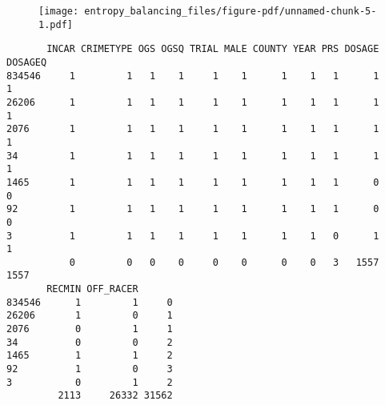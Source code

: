 \documentclass[
  letterpaper,
  DIV=11,
  numbers=noendperiod]{scrartcl}
\newenvironment{Shaded}{\begin{snugshade}}{\end{snugshade}}
\newcommand{\AttributeTok}[1]{\textcolor[rgb]{0.40,0.45,0.13}{#1}}
\newcommand{\ConstantTok}[1]{\textcolor[rgb]{0.56,0.35,0.01}{#1}}
\newcommand{\DecValTok}[1]{\textcolor[rgb]{0.68,0.00,0.00}{#1}}
\newcommand{\FunctionTok}[1]{\textcolor[rgb]{0.28,0.35,0.67}{#1}}
\newcommand{\NormalTok}[1]{\textcolor[rgb]{0.00,0.23,0.31}{#1}}
\newcommand{\OtherTok}[1]{\textcolor[rgb]{0.00,0.23,0.31}{#1}}
\newcommand{\SpecialCharTok}[1]{\textcolor[rgb]{0.37,0.37,0.37}{#1}}
\newcommand{\StringTok}[1]{\textcolor[rgb]{0.13,0.47,0.30}{#1}}
\begin{document}
\begin{figure}[H]

{\centering \texttt{[image: entropy\_balancing\_files/figure-pdf/unnamed-chunk-5-1.pdf]}

}

\end{figure}

\begin{verbatim}
       INCAR CRIMETYPE OGS OGSQ TRIAL MALE COUNTY YEAR PRS DOSAGE DOSAGEQ
834546     1         1   1    1     1    1      1    1   1      1       1
26206      1         1   1    1     1    1      1    1   1      1       1
2076       1         1   1    1     1    1      1    1   1      1       1
34         1         1   1    1     1    1      1    1   1      1       1
1465       1         1   1    1     1    1      1    1   1      0       0
92         1         1   1    1     1    1      1    1   1      0       0
3          1         1   1    1     1    1      1    1   0      1       1
           0         0   0    0     0    0      0    0   3   1557    1557
       RECMIN OFF_RACER      
834546      1         1     0
26206       1         0     1
2076        0         1     1
34          0         0     2
1465        1         1     2
92          1         0     3
3           0         1     2
         2113     26332 31562
\end{verbatim}

\begin{Shaded}
\end{Shaded}
\end{document}
